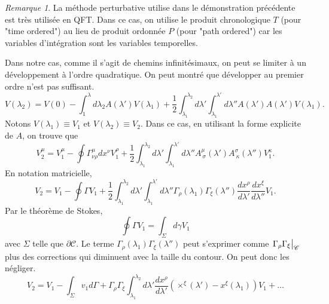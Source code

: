 \documentclass[a4paper,11pt]{report}
\theoremstyle{definition}
\theoremstyle{plain}
\theoremstyle{definition}
\theoremstyle{remark}
\newtheorem{rmk}{Remarque}[chapter]
\newcommand{\x}{\times}
\newcommand{\p}{\partial}
\begin{document}
                \begin{rmk}
                    La méthode perturbative utilise dans le démonstration précédente est très utilisée en QFT. Dans ce cas, on utilise le produit chronologique $T$ (pour "time ordered") au lieu de produit ordonnée $P$ (pour "path ordered") car les variables d'intégration sont les variables temporelles.
                \end{rmk}
                
                Dans notre cas, comme il s'agit de chemins infinitésimaux, on peut se limiter à un développement à l'ordre quadratique. On peut montré que développer au premier ordre n'est pas suffisant.
                \begin{equation}
                        V(\lambda_2) = V(0) - \int_1^\lambda d\lambda_2 A(\lambda')V(\lambda_1)+\frac{1}{2}\int_{\lambda_1}^{\lambda_2} d\lambda'\int_{\lambda_1}^{\lambda'}d\lambda''A(\lambda')A(\lambda')V(\lambda_1).
                    \end{equation}
                Notons $V(\lambda_1)\equiv V_1$ et $V(\lambda_2)\equiv V_2$. Dans ce cas, en utilisant la forme explicite de $A$, on trouve que 
                \begin{equation}
                    V_2^\mu = V_1^\mu - \oint \Gamma^\mu_{\nu\rho} dx^\nu V_1^\rho+\frac{1}{2}\int_{\lambda_1}^{\lambda_2} d\lambda'\int_{\lambda_1}^{\lambda'}d\lambda''A^\mu_{~\sigma}(\lambda')A^\sigma_{~\kappa}(\lambda'')V_1^\kappa.
                \end{equation}
                En notation matricielle, 
                \begin{equation}
                    V_2 = V_1 - \oint \Gamma V_1+\frac{1}{2}\int_{\lambda_1}^{\lambda_2} d\lambda'\int_{\lambda_1}^{\lambda'}d\lambda''\Gamma_\rho(\lambda_1)\Gamma_\xi(\lambda'')\frac{dx^\rho}{d\lambda'}\frac{dx^\xi}{d\lambda''} V_1.
                \end{equation}
                Par le théorème de Stokes,
                \begin{equation}
                     \oint \Gamma V_1 = \int_\Sigma d\gamma V_1
                \end{equation}
                avec $\Sigma$ telle que $\p\mathscr{C}$. Le terme $\Gamma_\rho(\lambda_1)\Gamma_\xi(\lambda'')$ peut s'exprimer comme $\eval{\Gamma_\rho\Gamma_\xi}_\mathscr{C}$ plus des corrections qui diminuent avec la taille du contour. On peut donc les négliger.
                \begin{equation}
                    V_2 = V_1-\int_\Sigma v_1 d\Gamma + \Gamma_\rho\Gamma_\xi \int_{\lambda_1}^{\lambda_2}d\lambda'\frac{dx^\rho}{d\lambda'}(\x^\xi(\lambda')-x^\xi(\lambda_1))V_1+\dots
                \end{equation}
\end{document}
